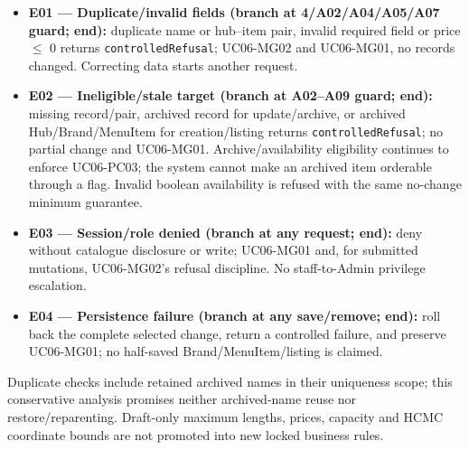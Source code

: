 \begin{itemize}
\item \textbf{E01 --- Duplicate/invalid fields (branch at 4/A02/A04/A05/A07 guard; end):} duplicate name or hub--item pair, invalid required field or price \ensuremath{\leq} 0 returns \texttt{controlledRefusal}; UC06-MG02 and UC06-MG01, no records changed. Correcting data starts another request.

\item \textbf{E02 --- Ineligible/stale target (branch at A02--A09 guard; end):} missing record/pair, archived record for update/archive, or archived Hub/Brand/MenuItem for creation/listing returns \texttt{controlledRefusal}; no partial change and UC06-MG01. Archive/availability eligibility continues to enforce UC06-PC03; the system cannot make an archived item orderable through a flag. Invalid boolean availability is refused with the same no-change minimum guarantee.

\item \textbf{E03 --- Session/role denied (branch at any request; end):} deny without catalogue disclosure or write; UC06-MG01 and, for submitted mutations, UC06-MG02's refusal discipline. No staff-to-Admin privilege escalation.

\item \textbf{E04 --- Persistence failure (branch at any save/remove; end):} roll back the complete selected change, return a controlled failure, and preserve UC06-MG01; no half-saved Brand/MenuItem/listing is claimed.

\end{itemize}
Duplicate checks include retained archived names in their uniqueness scope; this conservative analysis promises neither archived-name reuse nor restore/reparenting. Draft-only maximum lengths, prices, capacity and HCMC coordinate bounds are not promoted into new locked business rules.
